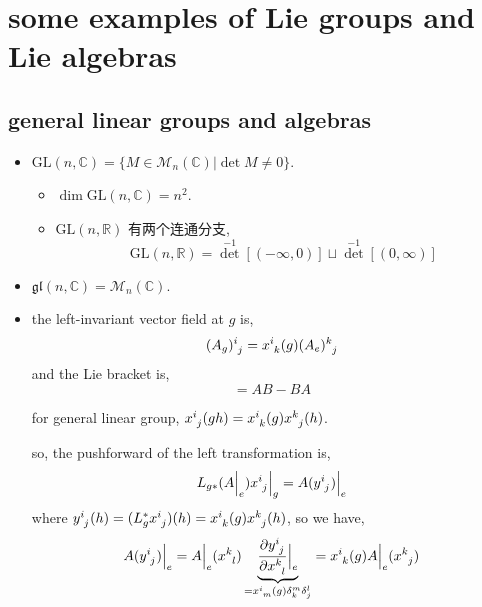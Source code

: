 \chapter{some examples of Lie groups and Lie algebras}
\section{general linear groups and algebras}
\begin{itemize}
	\item $\mathrm{GL}(n, \mathbb{C}) = \{M \in \mathcal{M}_n(\mathbb{C}) | \det M \neq 0\}$.
	\begin{itemize}
		\item $\dim \mathrm{GL}(n, \mathbb{C}) = n^2$.
		
		\item $\mathrm{GL}(n, \mathbb{R})$ 有两个连通分支,
		\begin{equation}
			\mathrm{GL}(n, \mathbb{R}) = {\det}^{- 1}[(- \infty, 0)] \sqcup {\det}^{- 1}[(0, \infty)]
		\end{equation}
	\end{itemize}
	
	\item $\mathfrak{gl}(n, \mathbb{C}) = \mathcal{M}_n(\mathbb{C})$.
	
	\item the left-invariant vector field at $g$ is,
	\begin{equation}
		\tensor{(A_g)}{^i_j} = \tensor{x}{^i_k}(g) \tensor{(A_e)}{^k_j}
	\end{equation}
	and the Lie bracket is,
	\begin{equation}
		[A, B] = A B - B A
	\end{equation}
	
	\begin{tcolorbox}[title=proof:]
		for general linear group, $\tensor{x}{^i_j}(g h) = \tensor{x}{^i_k}(g) \tensor{x}{^k_j}(h)$.
		
		so, the pushforward of the left transformation is,
		\begin{equation}
			L_{g *} (A \Big|_e) \tensor{x}{^i_j} \Big|_g = A(\tensor{y}{^i_j}) \Big|_e
		\end{equation}
		where $\tensor{y}{^i_j}(h) = (L_g^* \tensor{x}{^i_j})(h) = \tensor{x}{^i_k}(g) \tensor{x}{^k_j}(h)$, so we have,
		\begin{equation}
			A(\tensor{y}{^i_j}) \Big|_e = A \Big|_e (\tensor{x}{^k_l}) \underbrace{\frac{\partial \tensor{y}{^i_j}}{\partial \tensor{x}{^k_l}} \Big|_e}_{= \tensor{x}{^i_m}(g) \delta^m_k \delta^l_j} = \tensor{x}{^i_k}(g) A \Big|_e (\tensor{x}{^k_j})
		\end{equation}
		

\end{tcolorbox}
\end{itemize}
